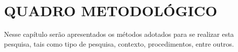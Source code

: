 \chapter{QUADRO METODOLÓGICO}

	\par Nesse capítulo serão apresentados os métodos adotados para se realizar esta
pesquisa, tais como tipo de pesquisa, contexto, procedimentos, entre outros.




